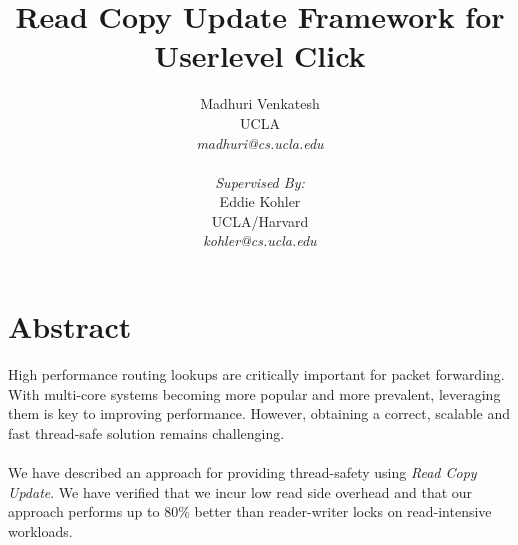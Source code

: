 \documentclass{article}
\begin{document}
\author { 
Madhuri Venkatesh 
\\ UCLA 
\\ \textsl{madhuri@cs.ucla.edu}
\\
\\
\textsl{Supervised By:}
\\Eddie Kohler 
\\ UCLA/Harvard
\\ \textsl{kohler@cs.ucla.edu}
}
\title{Read Copy Update Framework for Userlevel Click}
\maketitle

\pagebreak
\section{Abstract}
High performance routing lookups are critically important for packet forwarding. With multi-core systems becoming more popular and more prevalent, leveraging them is key to improving performance. However, obtaining a correct, scalable and fast thread-safe solution remains challenging. 
\\\\We have described an approach for providing thread-safety using \emph{Read Copy Update}. We have verified that we incur low read side overhead and that our approach performs up to 80\% better than reader-writer locks on read-intensive workloads.
\end{document}
